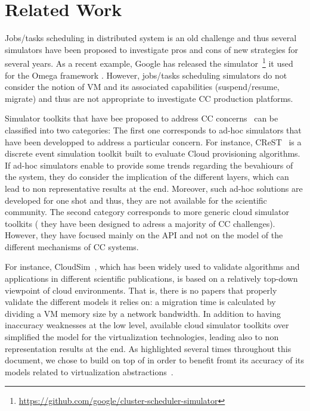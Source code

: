 \section{Related Work}
\label{sec:related}

Jobs/tasks scheduling in distributed
system is an old challenge and thus several simulators have been
proposed to investigate pros and cons of new strategies for several years. As a recent
example, Google has released the simulator~\footnote{\href{https://github.com/google/cluster-scheduler-simulator}{https://github.com/google/cluster-scheduler-simulator}} it used for the Omega
framework \cite{schwarzkopf:2013}. However, jobs/tasks scheduling
simulators do not consider the notion of VM and its associated
capabilities (suspend/resume, migrate) and thus are not appropriate
to investigate CC production platforms.

Simulator toolkits that have bee proposed to address CC
concerns~\cite{cloudsim, CC13, DGSIM,  greencloud,
  icancloud} can be classified into two categories: The first
one corresponds to ad-hoc simulators that have been developped to
address a particular concern. For instance, CReST~\cite{CC13} is a
discrete event simulation toolkit built to evaluate Cloud provisioning
algorithms. If ad-hoc simulators enable to provide some trends
regarding the bevahiours of the system, they do consider the
implication of the different layers, which can lead to non
representative results at the end. Moreover, such ad-hoc solutions are
developed for one shot and thus, they are not available for the
scientific community. The second category \cite{cloudsim, greencloud,
  icancloud} corresponds to more generic cloud simulator toolkits (\ie
they have been designed to adress a majority of CC
challenges). However, they have focused mainly on the API and not on
the model of the different mechanisms of CC systems.

For instance, CloudSim~\cite{cloudsim}, which has been widely used to
validate algorithms and applications in different scientific
publications, is based on a relatively top-down viewpoint of cloud
environments.  That is, there is no papers that properly validate the
different models it relies on: a migration time is calculated by
dividing a VM memory size by a network bandwidth.
 In addition to having inaccuracy weaknesses at the low level, available cloud
simulator toolkits over simplified the model for the virtualization
technologies, leading also to non representation results at the
end. As highlighted several times throughout this document, we chose to
build \vmps on top of \sg in order to benefit fromt its accuracy of
its models related to virtualization abstractions~\cite{Hirofuchi:2013:ALM:2568486.2568524}.


